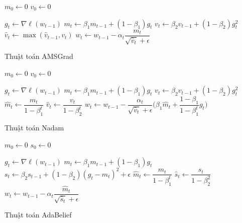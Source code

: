 \documentclass[14pt, a4paper]{article}
\theoremstyle{sltheorem}
\theoremstyle{soltheorem}
\begin{document}
\begin{algorithm}[h!]
    \DontPrintSemicolon

    $m_0 \gets 0$\;
    $v_0 \gets 0$\;

     {
        $g_t \gets \nabla \ell(w_{t-1})$\;
        $m_t \gets \beta_1 m_{t-1} + (1 - \beta_1)g_t$\;
        $v_t \gets \beta_2 v_{t-1} + (1 - \beta_2)g_t^2$\;
        $\hat{v}_t \gets \max(\hat{v}_{t-1}, v_t)$\;
        $w_t \gets w_{t-1} - \alpha_t \dfrac{m_t}{\sqrt{\hat{v}_t} + \epsilon}$\;
    }

    \;
    \caption{Thuật toán AMSGrad}
\end{algorithm}


\begin{algorithm}[h!]
    \DontPrintSemicolon

    $m_0 \gets 0$\;
    $v_0 \gets 0$\;

     {
        $g_t \gets \nabla \ell(w_{t-1})$\;
        $m_t \gets \beta_1 m_{t-1} + (1 - \beta_1)g_t$\;
        $v_t \gets \beta_2 v_{t-1} + (1 - \beta_2)g_t^2$\;
        $\hat{m}_t \gets \dfrac{m_t}{1 - \beta_1^t}$\;
        $\hat{v}_t \gets \dfrac{v_t}{1 - \beta_2^t}$\;
        $w_t \gets w_{t-1} - \dfrac{\alpha_t}{\sqrt{\hat{v}_t} + \epsilon} \Bigg( \beta_1 \hat{m}_t + \dfrac{1 - \beta_1}{1 - \beta_1^t}g_t \Bigg)$\;
    }

    \;
    \caption{Thuật toán Nadam}
\end{algorithm}


\begin{algorithm}[h!]
    \DontPrintSemicolon

    $m_0 \gets 0$\;
    $s_0 \gets 0$\;

     {
        $g_t \gets \nabla \ell(w_{t-1})$\;
        $m_t \gets \beta_1 m_{t-1} + (1 - \beta_1)g_t$\;
        $s_t \gets \beta_2 s_{t-1} + (1-\beta_2)(g_t - m_t)^2 + \epsilon$\;
        $\hat{m}_t \gets \dfrac{m_t}{1 - \beta_1^t}$\;
        $\hat{s}_t \gets \dfrac{s_t}{1 - \beta_2^2}$\;
        $w_t \gets w_{t-1} - \alpha_t \dfrac{\hat{m}_t}{\sqrt{\hat{s}_t} + \epsilon}$
    }

    \;
    \caption{Thuật toán AdaBelief}
\end{algorithm}
\end{document}
